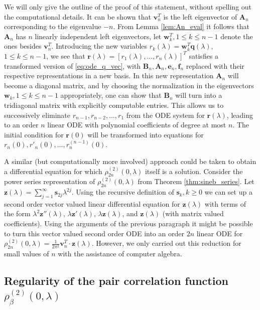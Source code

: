 \documentclass[12pt]{article}
\theoremstyle{definition} %
\theoremstyle{remark} %
\begin{document}
We will only give the outline of the proof of this statement, without spelling out the computational details. 
It can be shown that $\mathbf{v}_n^T$ is the left eigenvector of $\mathbf{A}_n$ corresponding to the eigenvalue $-n$. From Lemma \ref{lem:An_eval} it follows that  $\mathbf{A}_n$ has $n$ linearly independent left eigenvectors, let $\mathbf{w}_k^T, 1\le k\le n-1$ denote the  ones besides $\mathbf{v}_n^T$. Introducing the new variables $r_k(\lambda)=\mathbf{w}_k^T \mathbf{q}(\lambda)$, $1\le k\le n-1$, we see that $\mathbf{r}(\lambda)=[r_1(\lambda),\dots,r_n(\lambda)]^T$ satisfies a transformed version of \eqref{eq:ode_q_vec}, with $\mathbf{B}_n, \mathbf{A}_n, \mathbf{e}_n, \mathbf{f}_n$ replaced with their respective representations in a new basis. In this new representation $\mathbf{A}_n$ will become a diagonal matrix, and by choosing the normalization in the eigenvectors $\mathbf{w}_k, 1\le k\le n-1$ appropriately, one can show that $\mathbf{B}_n$ will turn into a tridiagonal matrix with explicitly computable entries. This allows us to successively eliminate $r_{n-1}, r_{n-2}, \dots, r_1$ from the ODE system for $\mathbf{r}(\lambda)$, leading to an order $n$ linear ODE  with polynomial coefficients of degree at most $n$. The initial condition for $\mathbf{r}(0)$ will be transformed into equations for $r_n(0), r'_n(0), \dots, r_n^{(n-1)}(0)$. 


A similar (but computationally more involved) approach could be taken to obtain a differential equation for which $\rho_{2n}^{(2)}(0,\lambda)$ itself is a solution.  Consider the power series representation of $\rho_{2n}^{(2)}(0,\lambda)$ from Theorem \ref{thm:sineb_series}. Let $\mathbf{z}(\lambda)=\sum_{j=1}^\infty \mathbf{s}_{2j} \lambda^{2j}$. Using the recursive definition of $\mathbf{s}_{k}, k\ge 0$ we can set up a second order vector valued linear differential equation for $\mathbf{z}(\lambda)$ with terms of the form $\lambda^2 \mathbf{z}''(\lambda)$, $\lambda \mathbf{z}'(\lambda)$, $\lambda \mathbf{z}(\lambda)$, and $\mathbf{z}(\lambda)$ (with matrix valued coefficients). Using the arguments of the previous paragraph it might be possible to turn this vector valued second order ODE into an order $2n$ linear ODE  for  $ \rho_{2n}^{(2)}(0,\lambda)=\frac{1}{2\pi^2} \mathbf{v}_n^T \cdot \mathbf{z}(\lambda)$. However, we only carried out this reduction for small values of $n$ with the assistance of computer algebra. 


\subsection{Regularity of the pair correlation function $\rho_{\beta}^{(2)}(0,\lambda)$}
\end{document}
